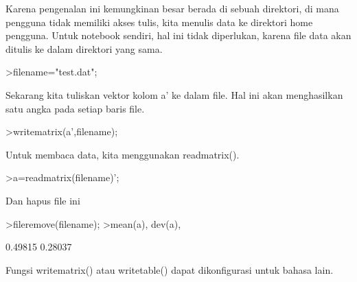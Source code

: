 \documentclass{article}
\begin{document}
\begin{eulernotebook}
\begin{eulercomment}
Karena pengenalan ini kemungkinan besar berada di sebuah direktori, di
mana pengguna tidak memiliki akses tulis, kita menulis data ke
direktori home pengguna. Untuk notebook sendiri, hal ini tidak
diperlukan, karena file data akan ditulis ke dalam direktori yang
sama.
\end{eulercomment}
\begin{eulerprompt}
>filename="test.dat";
\end{eulerprompt}
\begin{eulercomment}
Sekarang kita tuliskan vektor kolom a' ke dalam file. Hal ini akan
menghasilkan satu angka pada setiap baris file.
\end{eulercomment}
\begin{eulerprompt}
>writematrix(a',filename);
\end{eulerprompt}
\begin{eulercomment}
Untuk membaca data, kita menggunakan readmatrix().
\end{eulercomment}
\begin{eulerprompt}
>a=readmatrix(filename)';
\end{eulerprompt}
\begin{eulercomment}
Dan hapus file ini
\end{eulercomment}
\begin{eulerprompt}
>fileremove(filename);
>mean(a), dev(a),
\end{eulerprompt}
\begin{euleroutput}
  0.49815
  0.28037
\end{euleroutput}
\begin{eulercomment}
Fungsi writematrix() atau writetable() dapat dikonfigurasi untuk
bahasa lain.


\end{eulercomment}
\end{eulernotebook}
\end{document}
